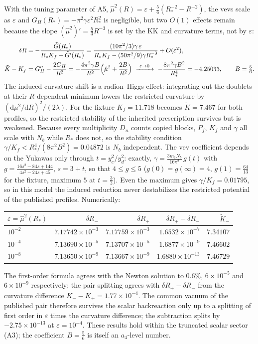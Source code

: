 \documentclass[11pt,letterpaper]{article}
\newcommand{\dd}{\mathrm d}
\newcommand{\hmu}{\hat\mu}
\begin{document}
With the tuning parameter of A5, $\hmu^2(R)=\varepsilon+\tfrac56(R_*^{-2}-R^{-2})$, the vevs scale as $\varepsilon$ and $G_H(R_*)=-\pi^2\gamma\varepsilon^2R_*^2$ is negligible, but two $O(1)$ effects remain because the slope $(\hmu^2)'=\tfrac53R^{-3}$ is set by the KK and curvature terms, not by $\varepsilon$:
\begin{align}
\delta R&=-\frac{\tilde G(R_*)}{R_*K_f+\tilde G'(R_*)}=\frac{(10\pi^2/3)\gamma\,\varepsilon}{R_*K_f-(50\pi^2/9)\gamma R_*^{-3}}+O(\varepsilon^2),\\
\tilde K-K_f&=G_H''-\frac{2G_H}{R^2}=-\frac{4\pi^2\gamma B}{R^2}\Bigl(\hmu^2+\frac{2B}{R^2}\Bigr)\ \xrightarrow{\ \varepsilon\to0\ }\ -\frac{8\pi^2\gamma B^2}{R_*^4}=-4.25033,\qquad B=\tfrac56 .
\label{eq:inducedK}
\end{align}
The induced curvature shift is a radion--Higgs effect: integrating out the doublets at their $R$-dependent minimum lowers the restricted curvature by $(\dd\mu^2/\dd R)^2/(2\lambda)$. For the fixture $K_f=11.718$ becomes $\tilde K=7.467$ for both profiles, so the restricted stability of the inherited prescription survives but is weakened. Because every multiplicity $D_n$ counts copied blocks, $P_f$, $K_f$ and $\gamma$ all scale with $N_b$ while $R_*$ does not, so the stability condition $\gamma/K_f<R_*^4/(8\pi^2B^2)=0.04872$ is $N_b$ independent. The vev coefficient depends on the Yukawas only through $t=y_e^2/y_d^2$: exactly, $\gamma=\frac{3m_1N_b}{16\pi^2}\,g(t)$ with $g=\frac{16s^2-84s+144}{4s^2-24s+45}$, $s=3+t$, so that $4\le g\le5$ ($g(0)=g(\infty)=4$, $g(1)=\tfrac{64}{13}$ for the fixture, maximum $5$ at $t=\tfrac32$). Even the maximum gives $\gamma/K_f=0.01795$, so in this model the induced reduction never destabilizes the restricted potential of the published profiles. Numerically:

\begin{center}\small
\begin{tabular}{@{}lrrrr@{}}
\toprule
$\varepsilon=\hmu^2(R_*)$ & $\delta R_-$ & $\delta R_+$ & $\delta R_+-\delta R_-$ & $\tilde K_-$\\
\midrule
$10^{-2}$ & $7.17742\times10^{-3}$ & $7.17759\times10^{-3}$ & $1.6532\times10^{-7}$ & $7.34107$\\
$10^{-4}$ & $7.13690\times10^{-5}$ & $7.13707\times10^{-5}$ & $1.6877\times10^{-9}$ & $7.46602$\\
$10^{-8}$ & $7.13650\times10^{-9}$ & $7.13667\times10^{-9}$ & $1.6880\times10^{-13}$ & $7.46729$\\
\bottomrule
\end{tabular}
\end{center}
The first-order formula agrees with the Newton solution to $0.6\%$, $6\times10^{-5}$ and $6\times10^{-9}$ respectively; the pair splitting agrees with $\delta R_+-\delta R_-$ from the curvature difference $K_--K_+=1.77\times10^{-4}$. The common vacuum of the published pair therefore survives the scalar backreaction only up to a splitting of first order in $\varepsilon$ times the curvature difference; the subtraction splits by $-2.75\times10^{-13}$ at $\varepsilon=10^{-4}$. These results hold within the truncated scalar sector (A3); the coefficient $B=\tfrac56$ is itself an $a_4$-level number.
\end{document}
